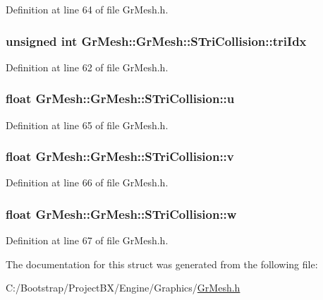 Definition at line 64 of file GrMesh.h.\hypertarget{struct_gr_mesh_1_1_s_tri_collision_625b98685d218e3ffcee8a1802298daf}{
\subsubsection[{triIdx}]{\setlength{\rightskip}{0pt plus 5cm}unsigned int GrMesh::GrMesh::STriCollision::triIdx}}
\label{struct_gr_mesh_1_1_s_tri_collision_625b98685d218e3ffcee8a1802298daf}




Definition at line 62 of file GrMesh.h.\hypertarget{struct_gr_mesh_1_1_s_tri_collision_e6ab3b0597fa4e4e7b8fa40f676af3b1}{
\subsubsection[{u}]{\setlength{\rightskip}{0pt plus 5cm}float GrMesh::GrMesh::STriCollision::u}}
\label{struct_gr_mesh_1_1_s_tri_collision_e6ab3b0597fa4e4e7b8fa40f676af3b1}




Definition at line 65 of file GrMesh.h.\hypertarget{struct_gr_mesh_1_1_s_tri_collision_0968edfada1308e305efea20a6fc4eea}{
\subsubsection[{v}]{\setlength{\rightskip}{0pt plus 5cm}float {\bf GrMesh::GrMesh::STriCollision::v}}}
\label{struct_gr_mesh_1_1_s_tri_collision_0968edfada1308e305efea20a6fc4eea}




Definition at line 66 of file GrMesh.h.\hypertarget{struct_gr_mesh_1_1_s_tri_collision_e2e9284d6e67030d452a77f285849f08}{
\subsubsection[{w}]{\setlength{\rightskip}{0pt plus 5cm}float {\bf GrMesh::GrMesh::STriCollision::w}}}
\label{struct_gr_mesh_1_1_s_tri_collision_e2e9284d6e67030d452a77f285849f08}




Definition at line 67 of file GrMesh.h.

The documentation for this struct was generated from the following file:\begin{CompactItemize}
\item 
C:/Bootstrap/ProjectBX/Engine/Graphics/\hyperlink{_gr_mesh_8h}{GrMesh.h}\end{CompactItemize}
